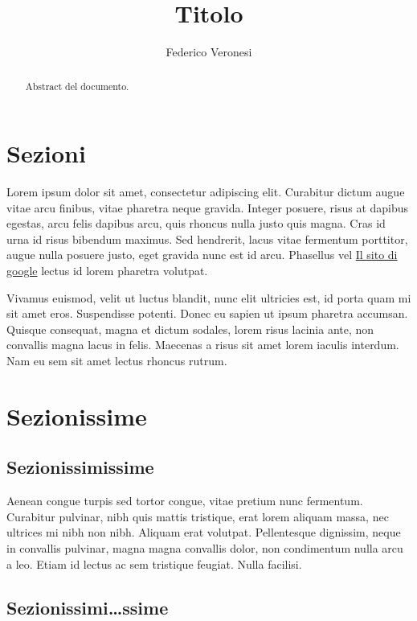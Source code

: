 \documentclass{article}
\title{Titolo}
\author{Federico Veronesi}
\begin{document}
\maketitle

{
  \hypersetup{linkcolor=black}
  \tableofcontents
}

\begin{abstract}
Abstract del documento.
\end{abstract}

\section{Sezioni}

Lorem ipsum dolor sit amet, consectetur adipiscing elit. Curabitur dictum augue vitae arcu finibus, vitae pharetra neque gravida. Integer posuere, risus at dapibus egestas, arcu felis dapibus arcu, quis rhoncus nulla justo quis magna. Cras id urna id risus bibendum maximus. Sed hendrerit, lacus vitae fermentum porttitor, augue nulla posuere justo, eget gravida nunc est id arcu. Phasellus vel \href{google.com}{Il sito di google} lectus id lorem pharetra volutpat.

Vivamus euismod, velit ut luctus blandit, nunc elit ultricies est, id porta quam mi sit amet eros. Suspendisse potenti. Donec eu sapien ut ipsum pharetra accumsan. Quisque consequat, magna et dictum sodales, lorem risus lacinia ante, non convallis magna lacus in felis. Maecenas a risus sit amet lorem iaculis interdum. Nam eu sem sit amet lectus rhoncus rutrum.

\section{Sezionissime}

\subsection{Sezionissimissime}

Aenean congue turpis sed tortor congue, vitae pretium nunc fermentum. Curabitur pulvinar, nibh quis mattis tristique, erat lorem aliquam massa, nec ultrices mi nibh non nibh. Aliquam erat volutpat. Pellentesque dignissim, neque in convallis pulvinar, magna magna convallis dolor, non condimentum nulla arcu a leo. Etiam id lectus ac sem tristique feugiat. Nulla facilisi.

\subsection{Sezionissimi\dots ssime}
\end{document}
